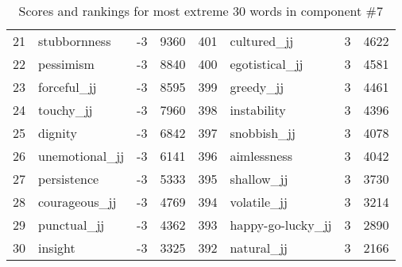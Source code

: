 \begin{table}[tbp]
\begin{tabular}{| rlr@{.}l | rlr@{.}l |}
    21 & stubbornness & -3 & 9360    &    401 & cultured\_jj & 3 & 4622 \\
    22 & pessimism & -3 & 8840    &    400 & egotistical\_jj & 3 & 4581 \\
    23 & forceful\_jj & -3 & 8595    &    399 & greedy\_jj & 3 & 4461 \\
    24 & touchy\_jj & -3 & 7960    &    398 & instability & 3 & 4396 \\
    25 & dignity & -3 & 6842    &    397 & snobbish\_jj & 3 & 4078 \\
    26 & unemotional\_jj & -3 & 6141    &    396 & aimlessness & 3 & 4042 \\
    27 & persistence & -3 & 5333    &    395 & shallow\_jj & 3 & 3730 \\
    28 & courageous\_jj & -3 & 4769    &    394 & volatile\_jj & 3 & 3214 \\
    29 & punctual\_jj & -3 & 4362    &    393 & happy-go-lucky\_jj & 3 & 2890 \\
    30 & insight & -3 & 3325    &    392 & natural\_jj & 3 & 2166 \\
    \hline
    \end{tabular}
    \caption{Scores and rankings for most extreme 30 words in component \#7} 
\end{table}
\clearpage
